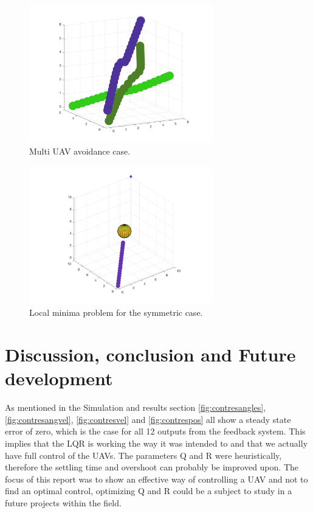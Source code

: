 \documentclass[journal]{IEEEtran}
\begin{document}
		\begin{figure}[H]
			\centering
			\includegraphics[width=8cm]{Results/Potentialfields/multi_uav_avoidance}
			\caption{Multi UAV avoidance case.}
			\label{fig:multi_uav_avoidance}
		\end{figure}

		\begin{figure}[H]
			\centering
			\includegraphics[width=8cm]{Results/Potentialfields/localminima}
			\caption{Local minima problem for the symmetric case.}
			\label{fig:localminima}
		\end{figure}
		
	\section{Discussion, conclusion and Future development}
	As mentioned in the Simulation and results section \figurename{ \ref{fig:contresangles}}, \figurename{ \ref{fig:contresangvel}}, \figurename{ \ref{fig:contresvel}} and \figurename{ \ref{fig:contrespos}} all show a steady state error of zero, which is the case for all 12 outputs from the feedback system. This implies that the LQR is working the way it was intended to and that we actually have full control of the UAVs. The parameters Q and R were heuristically, therefore the settling time and overshoot can probably be improved upon. The focus of this report was to show an effective way of controlling a UAV and not to find an optimal control, optimizing Q and R could be a subject to study in a  future projects within the field. \\
\end{document}
